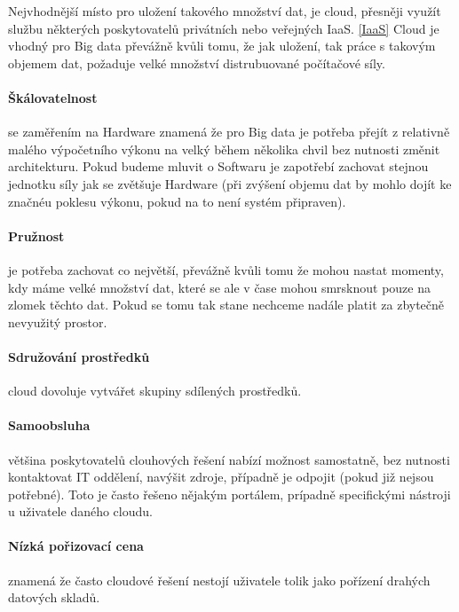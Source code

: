 Nejvhodnější místo pro uložení takového množství dat, je cloud, přesněji využít službu některých poskytovatelů privátních nebo veřejných IaaS. \ref{IaaS} Cloud je vhodný pro Big data převážně kvůli tomu, že jak uložení, tak práce s takovým objemem dat, požaduje velké množství distrubuované počítačové síly. \cite{big-data-dummies}

\paragraph{Škálovatelnost} se zaměřením na Hardware znamená že pro Big data je potřeba přejít z relativně malého výpočetního výkonu na velký během několika chvil bez nutnosti změnit architekturu. Pokud budeme mluvit o Softwaru je zapotřebí zachovat stejnou jednotku síly jak se zvětšuje Hardware (při zvýšení objemu dat by mohlo dojít ke značnéu poklesu výkonu, pokud na to není systém připraven). \cite{big-data-dummies}

\paragraph{Pružnost} je potřeba zachovat co největší, převážně kvůli tomu že mohou nastat momenty, kdy máme velké množství dat, které se ale v čase mohou smrsknout pouze na zlomek těchto dat. Pokud se tomu tak stane nechceme nadále platit za zbytečně nevyužitý prostor. \cite{big-data-dummies}

\paragraph{Sdružování prostředků} cloud dovoluje vytvářet skupiny sdílených prostředků. \cite{big-data-dummies}

\paragraph{Samoobsluha} většina poskytovatelů clouhových řešení nabízí možnost samostatně, bez nutnosti kontaktovat IT oddělení, navýšit zdroje, případně je odpojit (pokud již nejsou potřebné). Toto je často řešeno nějakým portálem, prípadně specifickými nástroji u uživatele daného cloudu. \cite{big-data-dummies}

\paragraph{Nízká pořizovací cena} znamená že často cloudové řešení nestojí uživatele tolik jako pořízení drahých datových skladů. \cite{big-data-dummies}

